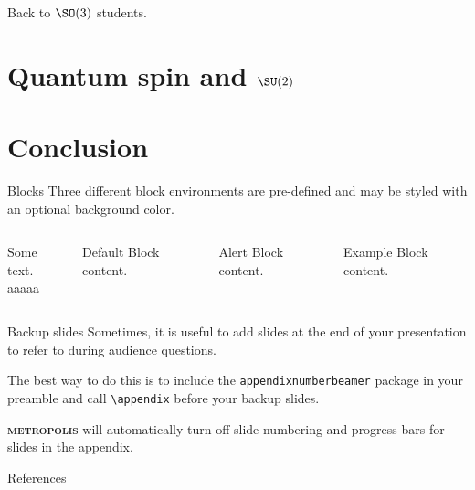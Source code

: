 \documentclass[9pt]{beamer}
\newcommand{\themename}{\textbf{\textsc{metropolis}}\xspace}
\begin{document}
\begin{frame}{Back to $\SO(3)$}
students.

\end{frame}

\section{Quantum spin and $\SU(2)$}

\section{Conclusion}

\begin{frame}{Blocks}
    Three different block environments are pre-defined and may be styled with an
    optional background color.
  
    \begin{columns}[T,onlytextwidth]
          
            Some text.\\[2cm]
            aaaaa
    
    
          \begin{block}{Default}
            Block content.
          \end{block}
    
          \begin{alertblock}{Alert}
            Block content.
          \end{alertblock}
    
          \begin{exampleblock}{Example}
            Block content.
          \end{exampleblock}
    
      \end{columns}

  \end{frame}

\appendix

\begin{frame}[fragile]{Backup slides}
  Sometimes, it is useful to add slides at the end of your presentation to
  refer to during audience questions.

  The best way to do this is to include the \verb|appendixnumberbeamer|
  package in your preamble and call \verb|\appendix| before your backup slides.

  \themename will automatically turn off slide numbering and progress bars for
  slides in the appendix.  \cite{ConcreteMath}
\end{frame}

\begin{frame}[allowframebreaks]{References}

  
  

\end{frame}
\end{document}
